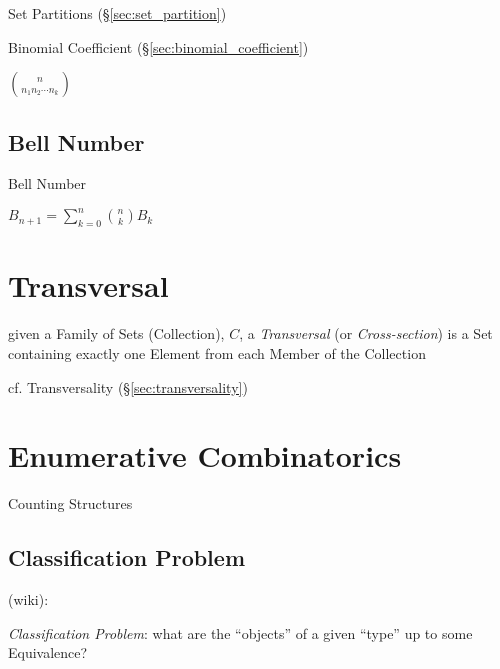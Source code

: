 Set Partitions (\S\ref{sec:set_partition})

Binomial Coefficient (\S\ref{sec:binomial_coefficient})

$\binom{n}{n_1 n_2 \cdots n_k}$



\subsection{Bell Number}\label{sec:bell_number}

Bell Number

$B_{n+1} = \sum_{k=0}^n \binom{n}{k} B_k$



\section{Transversal}\label{sec:transversal}

given a Family of Sets (Collection), $C$, a \emph{Transversal} (or
\emph{Cross-section}) is a Set containing exactly one Element from each Member
of the Collection

cf. Transversality (\S\ref{sec:transversality})



\section{Enumerative Combinatorics}
\label{sec:enumerative_combinatorics}

Counting Structures



\subsection{Classification Problem}\label{sec:classification_problem}

(wiki):

\emph{Classification Problem}: what are the ``objects'' of a
given ``type'' up to some Equivalence?



